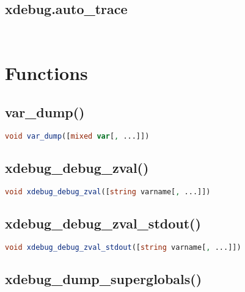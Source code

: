 \subsection{xdebug.auto\_trace}



\begin{lstlisting}[language=PHP]

\end{lstlisting}




\begin{lstlisting}[language=PHP]

\end{lstlisting}


\section{Functions}


\subsection{var\_dump()}


\begin{lstlisting}[language=PHP]
void var_dump([mixed var[, ...]])
\end{lstlisting}

\subsection{xdebug\_debug\_zval()}


\begin{lstlisting}[language=PHP]
void xdebug_debug_zval([string varname[, ...]])
\end{lstlisting}


\subsection{xdebug\_debug\_zval\_stdout()}


\begin{lstlisting}[language=PHP]
void xdebug_debug_zval_stdout([string varname[, ...]])
\end{lstlisting}


\subsection{xdebug\_dump\_superglobals()}



